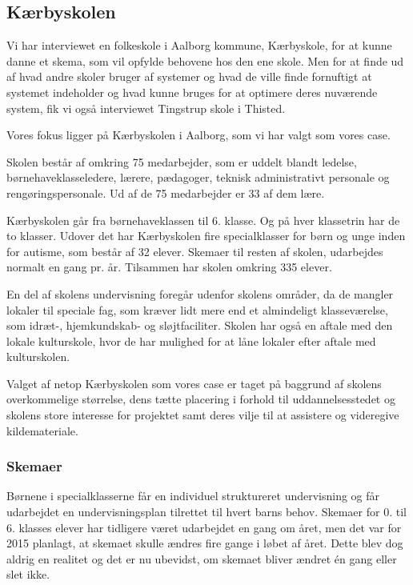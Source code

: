 \subsection{Kærbyskolen}
\label{Kaerbyskolen}
Vi har interviewet en folkeskole i Aalborg kommune, Kærbyskole, for at kunne danne et skema, som vil opfylde behovene hos den ene skole. Men for at finde ud af hvad andre skoler bruger af systemer og hvad de ville finde fornuftigt at systemet indeholder og hvad kunne bruges for at optimere deres nuværende system, fik vi også interviewet Tingstrup skole i Thisted.

Vores fokus ligger på Kærbyskolen i Aalborg, som vi har valgt som vores case.

Skolen består af omkring 75 medarbejder, som er uddelt blandt ledelse, børnehaveklasseledere, lærere, pædagoger, teknisk administrativt personale og rengøringspersonale. Ud af de 75 medarbejder er 33 af dem lære.

Kærbyskolen går fra børnehaveklassen til 6. klasse. Og på hver klassetrin har de to klasser. Udover det har Kærbyskolen fire specialklasser for børn og unge inden for autisme, som består af 32 elever. Skemaer til resten af skolen, udarbejdes normalt en gang pr. år. Tilsammen har skolen omkring 335 elever.

En del af skolens undervisning foregår udenfor skolens områder, da de mangler lokaler til speciale fag, som kræver lidt mere end et almindeligt klasseværelse, som idræt-, hjemkundskab- og sløjtfaciliter. Skolen har også en aftale med den lokale kulturskole, hvor de har mulighed for at låne lokaler efter aftale med kulturskolen.

Valget af netop Kærbyskolen som vores case er taget på baggrund af skolens overkommelige størrelse, dens tætte placering i forhold til uddannelsesstedet og skolens store interesse for projektet samt deres vilje til at assistere og videregive kildemateriale.

\subsubsection{Skemaer}
\label{Skemaer}
Børnene i specialklasserne får en individuel struktureret undervisning og får udarbejdet en undervisningsplan tilrettet til hvert barns behov\cite{j_klasser}.
Skemaer for 0. til 6. klasses elever har tidligere været udarbejdet en gang om året, men det var for 2015 planlagt, at skemaet skulle ændres fire gange i løbet af året. Dette blev dog aldrig en realitet og det er nu ubevidst, om skemaet bliver ændret én gang eller slet ikke.

